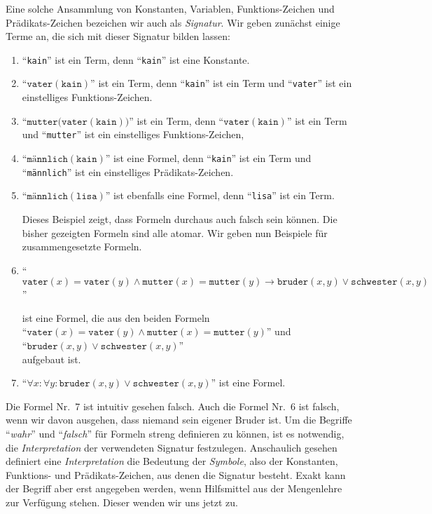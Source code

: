 Eine solche Ansammlung von Konstanten,
Variablen, Funktions-Zeichen und Prädikats-Zeichen bezeichen wir auch als
\emph{Signatur}.  Wir geben zunächst einige Terme an, die sich mit dieser Signatur
bilden lassen:
\begin{enumerate}
\item ``\texttt{kain}'' ist ein Term, denn ``\texttt{kain}'' ist eine Konstante.
\item ``$\mathtt{vater}(\mathtt{kain})$'' ist ein Term, denn ``\texttt{kain}''
      ist ein Term und ``\texttt{vater}'' ist ein einstelliges Funktions-Zeichen.
\item ``$\mathtt{mutter}\bigl(\mathtt{vater}(\mathtt{kain})\bigr)$'' ist ein Term, denn ``$\mathtt{vater}(\mathtt{kain})$'' ist
      ein Term und ``\texttt{mutter}'' ist ein einstelliges Funktions-Zeichen,
\item ``$\texttt{männlich}(\mathtt{kain})$'' ist eine Formel, denn
      ``\texttt{kain}'' ist ein Term und
      ``\texttt{männlich}'' ist ein einstelliges Prädikats-Zeichen.
\item ``$\texttt{männlich}(\mathtt{lisa})$'' ist ebenfalls eine Formel, denn
      ``\texttt{lisa}'' ist ein Term. 

      Dieses Beispiel zeigt, dass Formeln durchaus auch falsch sein können.  Die bisher
      gezeigten Formeln sind alle atomar.  Wir geben nun Beispiele für zusammengesetzte
      Formeln.
\item ``$\mathtt{vater}(x) = \mathtt{vater}(y) \wedge \mathtt{mutter}(x) = \mathtt{mutter}(y)
         \rightarrow       \mathtt{bruder}(x,y) \vee \mathtt{schwester}(x,y)$''
      
      ist eine Formel, die aus den beiden Formeln \\[0.2cm]
      \hspace*{1.3cm}  ``$\mathtt{vater}(x) = \mathtt{vater}(y) \wedge \mathtt{mutter}(x) = \mathtt{mutter}(y)$'' \quad und \\[0.2cm]
      \hspace*{1.3cm}  ``$\mathtt{bruder}(x,y) \vee \mathtt{schwester}(x,y)$'' \\[0.2cm]
      aufgebaut ist.  
\item ``$\forall x\colon \forall y\colon \mathtt{bruder}(x,y) \vee \mathtt{schwester}(x,y)$''   ist eine Formel.
\end{enumerate}
Die Formel Nr.~7 ist intuitiv gesehen falsch. 
Auch die Formel Nr.~6 ist falsch, wenn wir davon ausgehen, dass niemand sein eigener
Bruder ist.
Um die Begriffe ``\emph{wahr}'' und ``\emph{falsch}'' für Formeln streng definieren zu können,
ist es notwendig, die \emph{Interpretation} der verwendeten Signatur festzulegen. 
Anschaulich gesehen definiert eine \emph{Interpretation} die Bedeutung der \emph{Symbole},
also der Konstanten, Funktions- und Prädikats-Zeichen, aus denen die Signatur besteht.
Exakt kann der Begriff aber erst angegeben werden, wenn Hilfsmittel aus der Mengenlehre
zur Verfügung stehen.  Dieser wenden wir uns jetzt zu.

